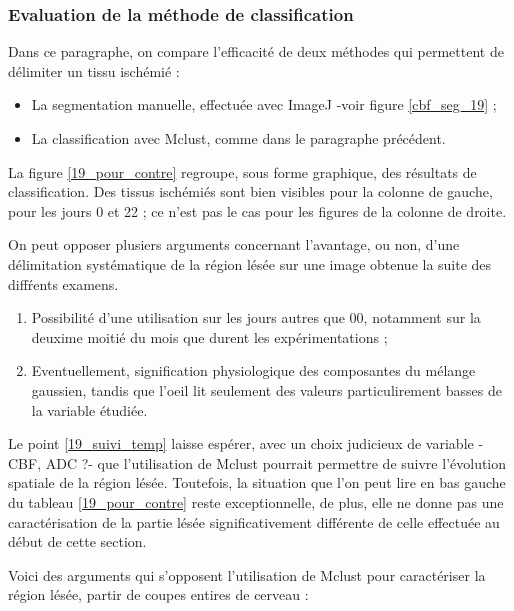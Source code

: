 \subsubsection{Evaluation de la m\'ethode de classification}

Dans ce paragraphe, on compare l'efficacit\'e de deux m\'ethodes qui permettent de d\'elimiter un tissu isch\'emi\'e :
\begin{itemize}
\item La segmentation manuelle, effectu\'ee avec ImageJ -voir figure \ref{cbf_seg_19} ;
\item La classification avec Mclust, comme dans le paragraphe pr\'ec\'edent.
\end{itemize}

\par
La figure \ref{19_pour_contre} regroupe, sous forme graphique, des r\'esultats de classification. %
Des tissus isch\'emi\'es sont bien visibles pour la colonne de gauche, pour les jours 0 et 22 ;
ce n'est pas le cas pour les figures de la colonne de droite.

\par
On peut opposer plusiers arguments concernant l'avantage, ou non, %
d'une d\'elimitation syst\'ematique de la r\'egion l\'es\'ee sur une image obtenue  la suite des diff\'rents examens.
\begin{enumerate}[label=\textbf{(Pour\arabic*)}]
\item\label{19_suivi_temp} Possibilit\'e d'une utilisation sur les jours autres que 00, notamment sur la deuxime moiti\'e du mois que durent les exp\'erimentations ;
\item\label{phy_gau} Eventuellement, signification physiologique des composantes du m\'elange gaussien, %
tandis que l'oeil lit seulement des valeurs particulirement basses de la variable \'etudi\'ee.
\end{enumerate}

Le point \ref{19_suivi_temp} laisse esp\'erer, avec un choix judicieux de variable -CBF, ADC ?- %
que l'utilisation de Mclust pourrait permettre de suivre l'\'evolution spatiale de la r\'egion l\'es\'ee. %
Toutefois, la situation que l'on peut lire en bas  gauche du tableau \ref{19_pour_contre} reste exceptionnelle, %
de plus, elle ne donne pas une caract\'erisation de la partie l\'es\'ee significativement diff\'erente de celle effectu\'ee au d\'ebut de cette section.

\etoile
Voici des arguments qui s'opposent  l'utilisation de Mclust pour caract\'eriser la r\'egion l\'es\'ee,  partir de coupes entires de cerveau :


